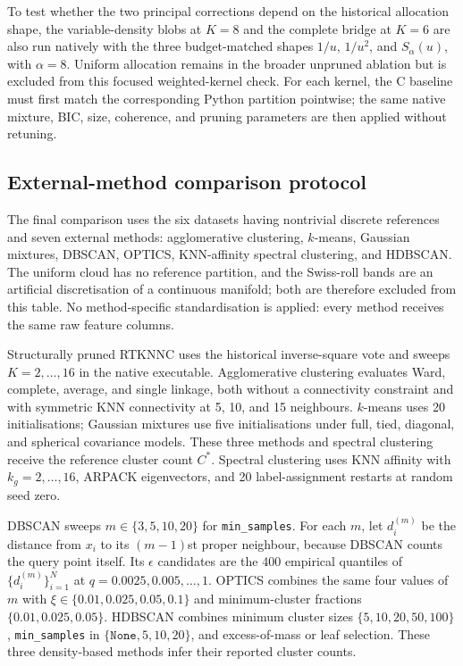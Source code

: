 \documentclass[pdflatex,sn-mathphys-num]{sn-jnl}
\begin{document}
To test whether the two principal corrections depend on the historical allocation shape,
the variable-density blobs at $K=8$ and the complete bridge at $K=6$ are also
run natively with the three budget-matched shapes $1/u$, $1/u^2$, and
$S_\alpha(u)$, with $\alpha=8$.  Uniform allocation remains in the broader
unpruned ablation but is excluded from this focused weighted-kernel check.  For
each kernel, the C baseline must first match the corresponding Python
partition pointwise; the same native mixture, BIC, size, coherence, and pruning
parameters are then applied without retuning.

\subsection{External-method comparison protocol}

The final comparison uses the six datasets having nontrivial discrete
references and seven external methods: agglomerative clustering, $k$-means,
Gaussian mixtures, DBSCAN, OPTICS, KNN-affinity spectral clustering, and
HDBSCAN\@.  The uniform cloud has no reference partition, and the Swiss-roll
bands are an artificial discretisation of a continuous manifold; both are
therefore excluded from this table.  No method-specific standardisation is
applied: every method receives the same raw feature columns.

Structurally pruned RTKNNC uses the historical inverse-square vote and sweeps
$K=2,\ldots,16$ in the native executable.  Agglomerative clustering evaluates
Ward, complete, average, and single linkage, both without a connectivity
constraint and with symmetric KNN connectivity at 5, 10, and 15 neighbours.
$k$-means uses 20 initialisations; Gaussian mixtures use five initialisations
under full, tied, diagonal, and spherical covariance models.  These three
methods and spectral clustering receive the reference cluster count $C^*$.
Spectral clustering uses KNN affinity with $k_g=2,\ldots,16$, ARPACK
eigenvectors, and 20 label-assignment restarts at random seed zero.

DBSCAN sweeps $m\in\{3,5,10,20\}$ for \texttt{min\_samples}.  For each $m$,
let $d_i^{(m)}$ be the distance from $x_i$ to its $(m-1)$st proper neighbour,
because DBSCAN counts the query point itself.  Its $\epsilon$ candidates are
the 400 empirical quantiles of $\{d_i^{(m)}\}_{i=1}^N$ at
$q=0.0025,0.005,\ldots,1$.  OPTICS combines the same four values of $m$ with
$\xi\in\{0.01,0.025,0.05,0.1\}$ and minimum-cluster fractions
$\{0.01,0.025,0.05\}$.  HDBSCAN combines minimum cluster sizes
$\{5,10,20,50,100\}$, \texttt{min\_samples} in
$\{\texttt{None},5,10,20\}$, and excess-of-mass or leaf selection.  These
three density-based methods infer their reported cluster counts.
\end{document}

